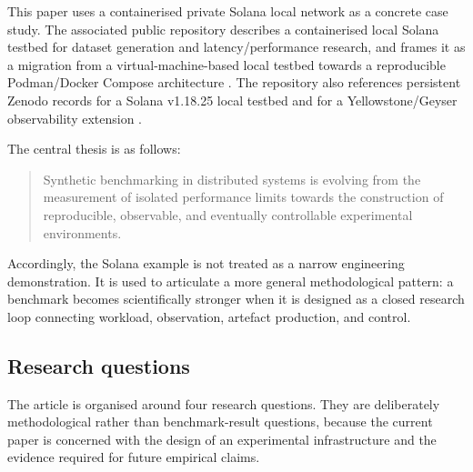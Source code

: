 \documentclass[11pt,a4paper]{article}
\begin{document}
This paper uses a containerised private Solana local network as a concrete case study. The associated public repository describes a containerised local Solana testbed for dataset generation and latency/performance research, and frames it as a migration from a virtual-machine-based local testbed towards a reproducible Podman/Docker Compose architecture \cite{okhoshaba2026repo}. The repository also references persistent Zenodo records for a Solana v1.18.25 local testbed and for a Yellowstone/Geyser observability extension \cite{khoshaba2026containerising,khoshaba2026yellowstone}.

The central thesis is as follows:

\begin{quote}
Synthetic benchmarking in distributed systems is evolving from the measurement of isolated performance limits towards the construction of reproducible, observable, and eventually controllable experimental environments.
\end{quote}

Accordingly, the Solana example is not treated as a narrow engineering demonstration. It is used to articulate a more general methodological pattern: a benchmark becomes scientifically stronger when it is designed as a closed research loop connecting workload, observation, artefact production, and control.

\subsection{Research questions}
\label{subsec:research-questions}

The article is organised around four research questions. They are deliberately methodological rather than benchmark-result questions, because the current paper is concerned with the design of an experimental infrastructure and the evidence required for future empirical claims.
\end{document}
